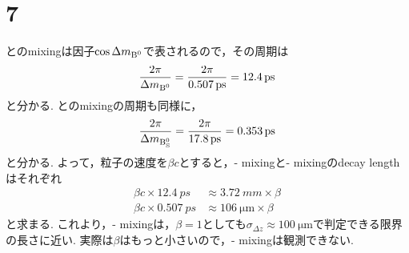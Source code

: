 \documentclass[a4paper,11pt]{jsarticle}
\begin{document}
\section*{7}
とのmixingは因子$\cos{\Delta m_{\ce{B^0}}}$で表されるので，その周期は
\begin{equation}
  \frac{2\pi}{\Delta m_{\ce{B^0}}} = \frac{2\pi}{\SI{0.507}{ps}} = \SI{12.4}{ps}
\end{equation}
と分かる.
とのmixingの周期も同様に，
\begin{equation}
  \frac{2\pi}{\Delta m_{\ce{B^0_S}}} = \frac{2\pi}{\SI{17.8}{ps}} = \SI{0.353}{ps}
\end{equation}
と分かる.
よって，粒子の速度を$\beta c$とすると，- mixingと- mixingのdecay lengthはそれぞれ
\begin{align}
  \beta c \times \SI{12.4}{ps} &\approx \SI{3.72}{mm}\times\beta  \\
  \beta c \times \SI{0.507}{ps} &\approx \SI{106}{\um}\times\beta  
\end{align}
と求まる.
これより，- mixingは，$\beta=1$としても$\sigma_{\Delta z} \approx \SI{100}{\um}$で判定できる限界の長さに近い.
実際は$\beta$はもっと小さいので，- mixingは観測できない.
\end{document}
